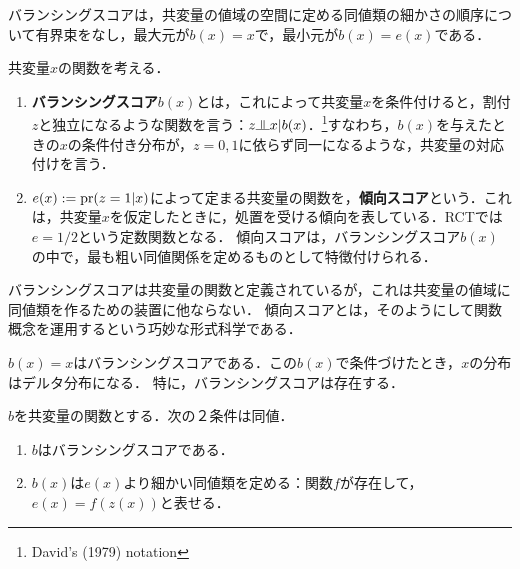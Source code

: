 \documentclass[uplatex,dvipdfmx]{jsreport}
\begin{document}
\begin{tcolorbox}[colframe=ForestGreen, colback=ForestGreen!10!white,breakable,colbacktitle=ForestGreen!40!white,coltitle=black,fonttitle=\bfseries\sffamily,
title=]
    バランシングスコアは，共変量の値域の空間に定める同値類の細かさの順序について有界束をなし，最大元が$b(x)=x$で，最小元が$b(x)=e(x)$である．
\end{tcolorbox}

\begin{definition}
    共変量$x$の関数を考える．
    \begin{enumerate}
        \item \textbf{バランシングスコア}$b(x)$とは，これによって共変量$x$を条件付けると，割付$z$と独立になるような関数を言う：$z\indep x|b(x)$．\footnote{David's (1979) notation}すなわち，$b(x)$を与えたときの$x$の条件付き分布が，$z=0,1$に依らず同一になるような，共変量の対応付けを言う．
        \item $e(x):=\mathrm{pr}(z=1|x)$によって定まる共変量の関数を，\textbf{傾向スコア}という．これは，共変量$x$を仮定したときに，処置を受ける傾向を表している．RCTでは$e=1/2$という定数関数となる．
        傾向スコアは，バランシングスコア$b(x)$の中で，最も粗い同値関係を定めるものとして特徴付けられる．
    \end{enumerate}
\end{definition}
\begin{remarks}
    バランシングスコアは共変量の関数と定義されているが，これは共変量の値域に同値類を作るための装置に他ならない．
    傾向スコアとは，そのようにして関数概念を運用するという巧妙な形式科学である．
\end{remarks}

\begin{example}
    $b(x)=x$はバランシングスコアである．この$b(x)$で条件づけたとき，$x$の分布はデルタ分布になる．
    特に，バランシングスコアは存在する．
\end{example}

\begin{lemma}[バランシングスコアと傾向スコアの特徴付け]
    $b$を共変量の関数とする．次の２条件は同値．
    \begin{enumerate}
        \item $b$はバランシングスコアである．
        \item $b(x)$は$e(x)$より細かい同値類を定める：関数$f$が存在して，$e(x)=f(z(x))$と表せる．
    \end{enumerate}
\end{lemma}
\end{document}
